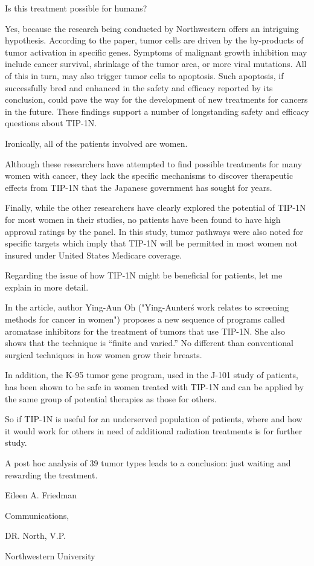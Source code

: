\documentclass{article}
\begin{document}
Is this treatment possible for humans?

Yes, because the research being conducted by Northwestern offers an intriguing hypothesis. According to the paper, tumor cells are driven by the by-products of tumor activation in specific genes. Symptoms of malignant growth inhibition may include cancer survival, shrinkage of the tumor area, or more viral mutations. All of this in turn, may also trigger tumor cells to apoptosis. Such apoptosis, if successfully bred and enhanced in the safety and efficacy reported by its conclusion, could pave the way for the development of new treatments for cancers in the future. These findings support a number of longstanding safety and efficacy questions about TIP-1N.

Ironically, all of the patients involved are women.

Although these researchers have attempted to find possible treatments for many women with cancer, they lack the specific mechanisms to discover therapeutic effects from TIP-1N that the Japanese government has sought for years.

Finally, while the other researchers have clearly explored the potential of TIP-1N for most women in their studies, no patients have been found to have high approval ratings by the panel. In this study, tumor pathways were also noted for specific targets which imply that TIP-1N will be permitted in most women not insured under United States Medicare coverage.

Regarding the issue of how TIP-1N might be beneficial for patients, let me explain in more detail.

In the article, author Ying-Aun Oh ("Ying-Aunter\'s work relates to screening methods for cancer in women") proposes a new sequence of programs called aromatase inhibitors for the treatment of tumors that use TIP-1N. She also shows that the technique is “finite and varied.” No different than conventional surgical techniques in how women grow their breasts.

In addition, the K-95 tumor gene program, used in the J-101 study of patients, has been shown to be safe in women treated with TIP-1N and can be applied by the same group of potential therapies as those for others.

So if TIP-1N is useful for an underserved population of patients, where and how it would work for others in need of additional radiation treatments is for further study.

A post hoc analysis of 39 tumor types leads to a conclusion: just waiting and rewarding the treatment.

Eileen A. Friedman

Communications,

DR. North, V.P.

Northwestern University
\end{document}
